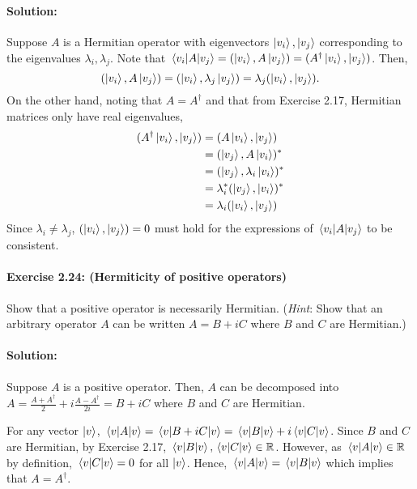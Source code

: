 \paragraph{Solution:} Suppose $A$ is a Hermitian operator with eigenvectors
$\ket{v_i}, \ket{v_j}$ corresponding to the eigenvalues $\lambda_i, \lambda_j$.
Note that $\mel{v_i}{A}{v_j} = (\ket{v_i}, A\ket{v_j}) = (A^\dagger \ket{v_i},
\ket{v_j})$. Then, \begin{equation*}
  (\ket{v_i}, A\ket{v_j}) = (\ket{v_i}, \lambda_j\ket{v_j}) = \lambda_j
    (\ket{v_i}, \ket{v_j}).
\end{equation*}
On the other hand, noting that $A = A^\dagger$ and that from Exercise 2.17,
Hermitian matrices only have real eigenvalues, \begin{align*}
  (A^\dagger \ket{v_i}, \ket{v_j}) &= (A\ket{v_i}, \ket{v_j}) \\
    &= (\ket{v_j}, A\ket{v_i})^* \\
    &= (\ket{v_j}, \lambda_i\ket{v_i})^* \\
    &= \lambda_i^*(\ket{v_j}, \ket{v_i})^* \\
    &= \lambda_i(\ket{v_i}, \ket{v_j})
\end{align*}
Since $\lambda_i \neq \lambda_j$, $(\ket{v_i}, \ket{v_j}) = 0$ must hold for
the expressions of $\mel{v_i}{A}{v_j}$ to be consistent.

\paragraph{\cite{mikeandike} Exercise 2.24: (Hermiticity of positive
operators)} Show that a positive operator is necessarily Hermitian.
(\emph{Hint}: Show that an arbitrary operator $A$ can be written $A = B + iC$
where $B$ and $C$ are Hermitian.)

\paragraph{Solution:} Suppose $A$ is a positive operator. Then, $A$ can be
decomposed into $A = \frac{A + A^\dagger}{2} + i\frac{A - A^\dagger}{2i} = B +
iC$ where $B$ and $C$ are Hermitian.

For any vector $\ket{v}$, $\mel{v}{A}{v} = \mel{v}{B + iC}{v} = \mel{v}{B}{v} +
i\mel{v}{C}{v}$. Since $B$ and $C$ are Hermitian, by Exercise 2.17,
$\mel{v}{B}{v}, \mel{v}{C}{v} \in \mathbb{R}$. However, as $\mel{v}{A}{v} \in
\mathbb{R}$ by definition, $\mel{v}{C}{v} = 0$ for all $\ket{v}$. Hence,
$\mel{v}{A}{v} = \mel{v}{B}{v}$ which implies that $A = A^\dagger$.

